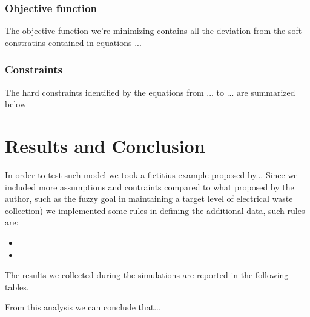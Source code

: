 \documentclass{article}
\begin{document}
\subsubsection{Objective function}
The objective function we're minimizing contains all the deviation from the soft constratins contained in equations ... 
\subsubsection{Constraints}
The hard constraints identified by the equations from ... to ... are summarized below 


\section{Results and Conclusion}
In order to test such model we took a fictitius example proposed by... Since we included more assumptions and contraints compared to what proposed by the author, such as the fuzzy goal in maintaining a target level of electrical waste collection) we implemented some rules in defining the additional data, such rules are:
\begin{itemize}
	\item
	\item
\end{itemize}
The results we collected during the simulations are reported in the following tables.

From this analysis we can conclude that...

\pagebreak

\printbibliography
\end{document}

